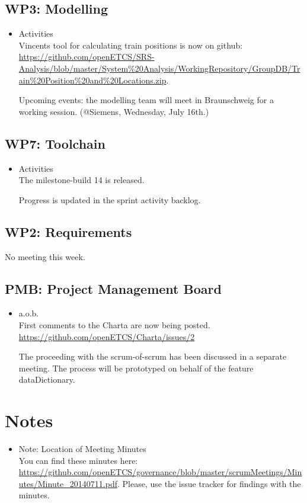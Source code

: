 \documentclass[a4paper, 11pt]{article}
\begin{document}
\subsection{WP3: Modelling}

\begin{itemize}
\item Activities\\
Vincents tool for calculating train positions is now on github: \url{https://github.com/openETCS/SRS-Analysis/blob/master/System%20Analysis/WorkingRepository/GroupDB/Train%20Position%20and%20Locations.zip}.

Upcoming events: the modelling team will meet in Braunschweig for a working session. (@Siemens, Wednesday, July 16th.)

\end{itemize}

\subsection{WP7: Toolchain}

\begin{itemize}
\item Activities\\
The milestone-build 14 is released.

Progress is updated in the sprint activity backlog.

\end{itemize}

\subsection{WP2: Requirements}


No meeting this week.


\subsection{PMB: Project Management Board}
\begin{itemize}
\item a.o.b.\\
First comments to the Charta are now being posted. \url{https://github.com/openETCS/Charta/issues/2}

The proceeding with the scrum-of-scrum has been discussed in a separate meeting. The process will be prototyped on behalf of the feature dataDictionary.

\end{itemize}

\section{Notes}
\begin{itemize}

\item Note: Location of Meeting Minutes\\
You can find these minutes here: \url{https://github.com/openETCS/governance/blob/master/scrumMeetings/Minutes/Minute_20140711.pdf}. Please, use the issue tracker for findings with the minutes.

\end{itemize}
\end{document}
